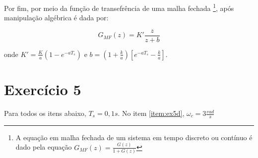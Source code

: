 \documentclass[twoside, fleqn]{article}
\begin{document}
    Por fim, por meio da função de transefrência de uma malha fechada \footnote{A equação em malha fechada de um sistema em tempo discreto ou contínuo é dado pela equação $G_{MF}(z) = \frac{G(z)}{1+G(z)}$}, após manipulação algébrica é dada por:
    
        \begin{equation}
            G_{MF}(z) = K' \frac{z}{z+b}
        \end{equation}
        
    onde $K' = \frac{K}{a} (1-e^{-aT_s}) \mbox{ e } b = (1 + \frac{k}{a})\left[e^{-aT_s} - \frac{k}{a} \right] $.

\section*{Exercício 5}
    Para todos os itens abaixo, $T_s = 0,1 s$. No item \ref{item:ex5d}, $\omega_c = 3 \frac{rad}{s}$
    
\end{document}

